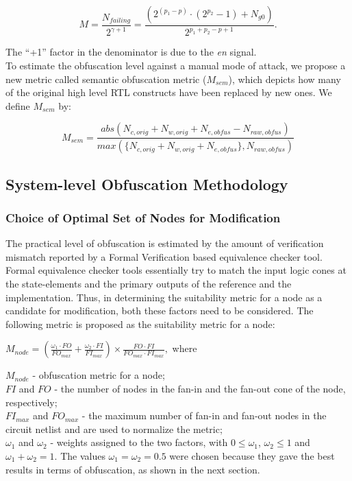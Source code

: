 \documentclass{optica-article}
\begin{document}
\begin{equation}
    \label{equation:3}
    M=\frac{N_{failing}}{2^{\gamma+1}} =\frac{(2^{(p_1- p)}\cdot(2^{p_2} - 1)+N_{g0})}{2^{p_1+p_2-p+1}}.
\end{equation}

\indent The “+1” factor in the denominator is due to the \textit{en} signal.\\
\indent To estimate the obfuscation level against a manual mode of attack, we propose a new metric called semantic obfuscation metric ($M_{sem}$), which depicts how many of the original high level RTL constructs have been replaced by new ones. We define $M_{sem}$ by:

\begin{equation}
    \label{equation:4}
    M_{sem}=\frac{abs(N_{c,orig}+N_{w,orig}+N_{e,obfus}-N_{raw,obfus})}{max(\{N_{c,orig}+N_{w,orig}+N_{e,obfus}\},N_{raw,obfus})}
\end{equation}


\subsection{System-level Obfuscation Methodology}

\subsubsection{Choice of Optimal Set of Nodes for Modification}

The practical level of obfuscation is estimated by the amount of verification mismatch reported by a Formal Verification based equivalence checker tool. Formal equivalence checker tools essentially try to match the input logic cones at the state-elements and the primary outputs of the reference and the implementation. Thus, in determining the suitability metric for a node as a candidate for modification, both these factors need to be considered. The following metric is proposed as the suitability metric for a node:

\begin{center} %
$
      M_{node}=\left(\frac{\omega_1\cdot FO}{FO_{max}}+\frac{\omega_2\cdot FI}{FI_{max}}\right)\times\frac{FO\cdot FI}{FO_{max}\cdot FI_{max}},
$    where
\end{center}

$M_{node}$ - obfuscation metric for a node;\\
$FI$ and $FO$ - the number of nodes in the fan-in and the fan-out cone of the node, respectively;\\
$FI_{max}$ and $FO_{max}$ - the maximum number of fan-in and fan-out nodes in the circuit netlist and are used to normalize the metric;\\
$\omega_1$ and $\omega_2$ - weights assigned to the two factors, with $0\leq\omega_1$, $\omega_2\leq1$ and $\omega_1 + \omega_2 = 1$. The values $\omega_1 = \omega_2 = 0.5$ were chosen because they gave the best results in terms of obfuscation, as shown in the next section.
\end{document}
